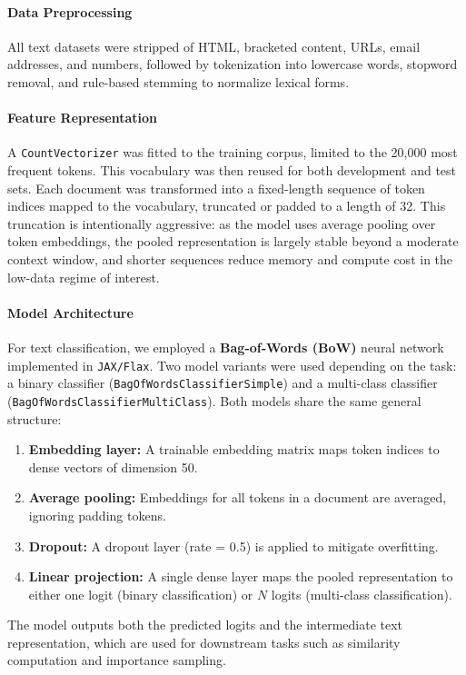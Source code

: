 \paragraph{Data Preprocessing}
All text datasets were stripped of HTML, bracketed content, URLs, email addresses, and numbers, followed by tokenization into lowercase words, stopword removal, and rule-based stemming to normalize lexical forms. 

\paragraph{Feature Representation}
A \texttt{CountVectorizer} was fitted to the training corpus, limited to the 20,000 most frequent tokens. This vocabulary was then reused for both development and test sets. Each document was transformed into a fixed-length sequence of token indices mapped to the vocabulary, truncated or padded to a length of 32. This truncation is intentionally aggressive: as the model uses average pooling over token embeddings, the pooled representation is largely stable beyond a moderate context window, and shorter sequences reduce memory and compute cost in the low-data regime of interest.

\paragraph{Model Architecture}
For text classification, we employed a \textbf{Bag-of-Words (BoW)} neural network implemented in \texttt{JAX/Flax}. Two model variants were used depending on the task: a binary classifier (\texttt{BagOfWordsClassifierSimple}) and a multi-class classifier (\texttt{BagOfWordsClassifierMultiClass}). Both models share the same general structure:
\begin{enumerate}
\item \textbf{Embedding layer:} A trainable embedding matrix maps token indices to dense vectors of dimension 50.
\item \textbf{Average pooling:} Embeddings for all tokens in a document are averaged, ignoring padding tokens.
\item \textbf{Dropout:} A dropout layer (rate = 0.5) is applied to mitigate overfitting.
\item \textbf{Linear projection:} A single dense layer maps the pooled representation to either one logit (binary classification) or $N$ logits (multi-class classification).
\end{enumerate}
The model outputs both the predicted logits and the intermediate text representation, which are used for downstream tasks such as similarity computation and importance sampling.



